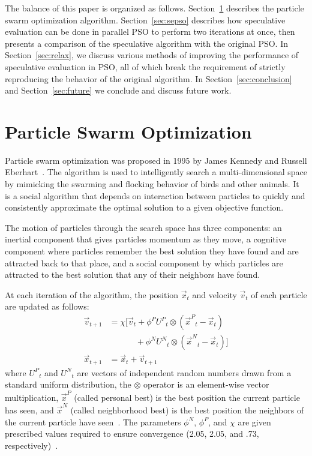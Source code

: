 \documentclass[journal,letterpaper]{IEEEtran}
\renewcommand{\sec}[1]{Section~\ref{sec:#1}}
\providecommand{\pers}{\ensuremath{P}}
\providecommand{\neigh}{\ensuremath{N}}
\providecommand{\nURand}{\ensuremath{U^\neigh}}
\providecommand{\pURand}{\ensuremath{U^\pers}}
\providecommand{\ppos}{\ensuremath{\Vec{x}}}
\providecommand{\pvel}{\ensuremath{\Vec{v}}}
\providecommand{\nbest}{\ensuremath{\Vec{x}^\neigh}}
\providecommand{\pbest}{\ensuremath{\Vec{x}^\pers}}
\providecommand{\constriction}{\ensuremath{\chi}}
\providecommand{\ncoeff}{\ensuremath{\phi^\neigh}}
\providecommand{\pcoeff}{\ensuremath{\phi^\pers}}
\begin{document}
The balance of this paper is organized as follows. \sec{pso} describes the
particle swarm optimization algorithm.  \sec{sepso} describes how speculative
evaluation can be done in parallel PSO to perform two iterations at once, then
presents a comparison of the speculative algorithm with the original PSO.  In
\sec{relax}, we discuss various methods of improving the performance of
speculative evaluation in PSO, all of which break the requirement of strictly
reproducing the behavior of the original algorithm.  In \sec{conclusion} and
\sec{future} we conclude and discuss future work.

\section{Particle Swarm Optimization}
\label{sec:pso}

Particle swarm optimization was proposed in 1995 by James Kennedy and Russell
Eberhart~\cite{kennedy-1995-particle-swarm-optimization}.  The algorithm is
used to intelligently search a multi-dimensional space by mimicking the
swarming and flocking behavior of birds and other animals. It is a social
algorithm that depends on interaction between particles to quickly and
consistently approximate the optimal solution to a given objective function.

The motion of particles through the search space has three components: an
inertial component that gives particles momentum as they move, a cognitive
component where particles remember the best solution they have found and are
attracted back to that place, and a social component by which particles are
attracted to the best solution that any of their neighbors have found.

At each iteration of the algorithm, the position $\ppos_t$ and velocity
$\pvel_t$ of each particle are updated as follows:
\begin{align}
\nonumber
	\pvel_{t+1} &=
		\constriction \bigl[ \pvel_t
			+ \pcoeff\pURand_{t}\otimes(\pbest_{t} - \ppos_{t}) \\
\label{eq:velupdate}
			& \quad \quad \quad \, + \ncoeff\nURand_{t}\otimes(\nbest_{t} - \ppos_{t})
		\bigr] \\
\label{eq:posupdate}
	\ppos_{t+1} &= \ppos_{t} + \pvel_{t+1}
\end{align}
where \( \pURand_{t} \) and \( \nURand_{t} \) are vectors of independent random
numbers drawn from a standard uniform distribution, the \( \otimes \) operator
is an element-wise vector multiplication, $\pbest$ (called personal best) is
the best position the current particle has seen, and $\nbest$ (called
neighborhood best) is the best position the neighbors of the current particle
have seen~\cite{bratton-2007-defining-a-standard-for-pso}.  The parameters \(
\ncoeff \), \( \pcoeff \), and \( \constriction \) are given prescribed values
required to ensure convergence (2.05, 2.05, and .73,
respectively)~\cite{clerc-2002-constricted-pso}. 
\end{document}
